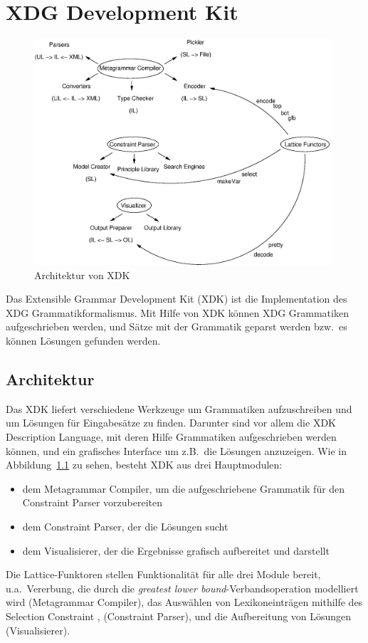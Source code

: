 \chapter{XDG Development Kit}\label{ch:XDK}

\begin{figure}[!ht]
\begin{center}
\includegraphics[width=11cm]{eps/xdk_architecture.eps}
\end{center}
\caption{Architektur von XDK}
\label{xdkarch}
\end{figure}

Das Extensible Grammar Development Kit (XDK) ist die Implementation
des XDG Grammatikformalismus. Mit Hilfe von XDK k\"onnen XDG
Grammatiken aufgeschrieben werden, und S\"atze mit der Grammatik
geparst werden bzw.\ es k\"onnen L\"osungen gefunden werden.

\section{Architektur}

Das XDK liefert verschiedene Werkzeuge um Grammatiken aufzuschreiben
und um L\"osungen f\"ur Eingabes\"atze zu finden. Darunter sind vor
allem die XDK Description Language, mit deren Hilfe Grammatiken
aufgeschrieben werden k\"onnen, und ein grafisches Interface um z.B.\
die L\"osungen anzuzeigen. Wie in Abbildung~\ref{xdkarch} zu sehen,
besteht XDK aus drei Hauptmodulen:
\begin{itemize}
\item dem Metagrammar Compiler, um die aufgeschriebene Grammatik f\"ur
  den Constraint Parser vorzubereiten
\item dem Constraint Parser, der die L\"osungen sucht
\item dem Visualisierer, der die Ergebnisse grafisch aufbereitet und
darstellt
\end{itemize}
Die Lattice-Funktoren stellen Funktionalit\"at f\"ur alle drei Module
bereit, u.a.\ Vererbung, die durch die \emph{greatest lower
bound}-Verbandsoperation modelliert wird (Metagrammar Compiler), das
Ausw\"ahlen von Lexikoneintr\"agen mithilfe des Selection Constraint
\cite{Duchier99}, \cite{Duchier03} (Constraint Parser), und die
Aufbereitung von L\"osungen (Visualisierer).

